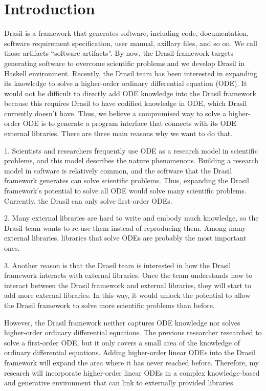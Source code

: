 \chapter{Introduction}
Drasil is a framework that generates software, including code, documentation, software requirement specification, user manual, axillary files, and so on. We call those artifacts ``software artifacts''. By now, the Drasil framework targets generating software to overcome scientific problems and we develop Drasil in Haskell environment. Recently, the Drasil team has been interested in expanding its knowledge to solve a higher-order ordinary differential equation (ODE). It would not be difficult to directly add ODE knowledge into the Drasil framework because this requires Drasil to have codified knowledge in ODE, which Drasil currently doesn't have. Thus, we believe a compromised way to solve a higher-order ODE is to generate a program interface that connects with its ODE external libraries. There are three main reasons why we want to do that.

1. Scientists and researchers frequently use ODE as a research model in scientific problems, and this model describes the nature phenomenons. Building a research model in software is relatively common, and the software that the Drasil framework generates can solve scientific problems. Thus, expanding the Drasil framework's potential to solve all ODE would solve many scientific problems. Currently, the Drasil can only solve first-order ODEs.

2. Many external libraries are hard to write and embody much knowledge, so the Drasil team wants to re-use them instead of reproducing them. Among many external libraries, libraries that solve ODEs are probably the most important ones. 

3. Another reason is that the Drasil team is interested in how the Drasil framework interacts with external libraries. Once the team understands how to interact between the Drasil framework and external libraries, they will start to add more external libraries. In this way, it would unlock the potential to allow the Drasil framework to solve more scientific problems than before. 

However, the Drasil framework neither captures ODE knowledge nor solves higher-order ordinary differential equations. The previous researcher researched to solve a first-order ODE, but it only covers a small area of the knowledge of ordinary differential equations. Adding higher-order linear ODEs into the Drasil framework will expand the area where it has never reached before. Therefore, my research will incorporate higher-order linear ODEs in a complex knowledge-based and generative environment that can link to externally provided libraries.

